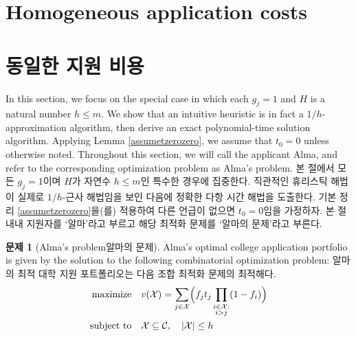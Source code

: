 \documentclass[11pt]{article} %
\theoremstyle{definition}
\newtheorem{problem}{Problem}
\theoremstyle{definition}
\newtheorem{problem}{문제}
\begin{document}
\ifen \section{Homogeneous application costs}  \else \section{동일한 지원 비용} \fi \label{homogappcosts}
\ifen In this section, we focus on the special case in which each $g_j = 1$ and $H$ is a natural number $h \leq m$.   We show that an intuitive heuristic is in fact a $1/h$-approximation algorithm, then derive an exact polynomial-time solution algorithm. 
Applying Lemma \ref{assumetzerozero}, we assume that $t_0 = 0$ unless otherwise noted. Throughout this section, we will call the applicant Alma, and refer to the corresponding optimization problem as Alma's problem. 
\else
본 절에서 모든 $g_j = 1$이며 $H$가 자연수 $h \leq m$인 특수한 경우에 집중한다. 직관적인 휴리스틱 해법이 실제로 $1/h$-근사 해법임을 보인 다음에 정확한 다항 시간 해법을 도출한다. 
기본 정리 \ref{assumetzerozero}을(를) 적용하여 다른 언급이 없으면 $t_0 = 0$임을 가정하자. 본 절 내내 지원자를 `알마'라고 부르고 해당 최적화 문제를 `알마의 문제'라고 부른다.
\fi

\begin{problem}[\ifen Alma’s problem\else 알마의 문제\fi]
\ifen Alma's optimal college application portfolio is given by the solution to the following combinatorial optimization problem:
\else
알마의 최적 대학 지원 포트폴리오는 다음 조합 최적화 문제의 최적해다.
\fi
\begin{align}
\begin{split}
\text{maximize}\quad &  v(\mathcal{X}) = \sum_{j\in
\mathcal{X}} \Bigl( f_j t_j \prod_{\substack{i \in \mathcal{X}: \\ i > j}} (1 - f_{i}) \Bigr)\\
\text{subject to}\quad & \mathcal{X}\subseteq\mathcal{C}, \quad|\mathcal{X}| \leq h 
\end{split}
\end{align}
\end{problem}
\end{document}
